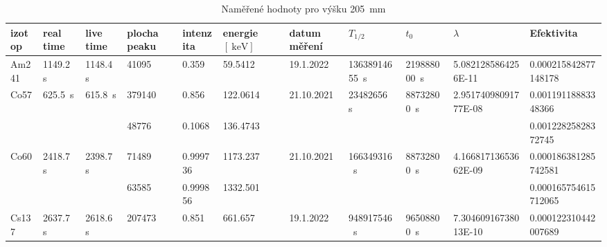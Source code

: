 \documentclass[12pt,a4paper]{article}
\begin{document}
\begin{spacing}{1.5}
\begin{landscape}
\begin{table}
	\caption{Naměřené hodnoty pro výšku \SI{205}{\milli\meter}}
	\vspace*{2mm}
	\hspace*{-2cm}
	\begin{tabular}{l|l|l|l|l|l|l|l|l|l|l}
		\hline
		izotop                & real time                			 & live time                			& plocha peaku 	& intenzita	   & energie $ [\SI{}{\kilo\electronvolt}] $& datum měření              & $ T_{1/2}  $                 			    & $t_0$                        			  & $\lambda$                                		& Efektivita                \\ \hline
		Am241                 & \SI{1149.2}{\second}                  & \SI{1148.4}{\second}                  & \num{41095}   & \num{0.359}    & \num{59.5412}      				& 19.1.2022                   & \SI{13638914655}{\second}                & \SI{219888000}{\second}                 & \num{5.0821285864256E-11}                   & \num{0.000215842877148178}  \\ \hline
		\multirow{2}{*}{Co57} & \multirow{2}{*}{\SI{625.5}{\second}}   & \multirow{2}{*}{\SI{615.8}{\second}}& \num{379140}   & \num{0.856}    & \num{122.0614}     				& \multirow{2}{*}{21.10.2021} & \multirow{2}{*}{\SI{23482656}{\second}}  & \multirow{2}{*}{\SI{88732800}{\second}} & \multirow{2}{*}{\num{2.95174098091777E-08}} & \num{0.00119118883348366}  \\  
		&                         			   						 &                         				& \num{48776}   & \num{0.1068}   & \num{136.4743}     				  &                             &                            				&                           			  &                                       		& \num{0.00122825828372745}  \\ \hline
		\multirow{2}{*}{Co60} & \multirow{2}{*}{\SI{2418.7}{\second}}& \multirow{2}{*}{\SI{2398.7}{\second}}  & \num{71489}  & \num{0.999736} & \num{1173.237}     				  & \multirow{2}{*}{21.10.2021} & \multirow{2}{*}{\SI{166349316}{\second}} & \multirow{2}{*}{\SI{88732800}{\second}} & \multirow{2}{*}{\num{4.16681713653662E-09}} & \num{0.000186381285742581}  \\  
		&                          			   						 &                          			& \num{63585}  & \num{0.999856} & \num{1332.501}    					&                             &                            				&                           			  &                                       	& \num{0.000165754615712065}  \\ \hline
		Cs137                 & \SI{2637.7}{\second}                  & \SI{2618.6}{\second}                  & \num{207473}  & \num{0.851}    & \num{661.657}      				& 19.1.2022                   & \SI{948917546}{\second}                  & \SI{96508800}{\second}                  & \num{7.30460916738013E-10}                  & \num{0.000122310442007689}  \\ \hline
	\end{tabular}
\end{table}
\end{landscape}
\end{spacing}
\end{document}
